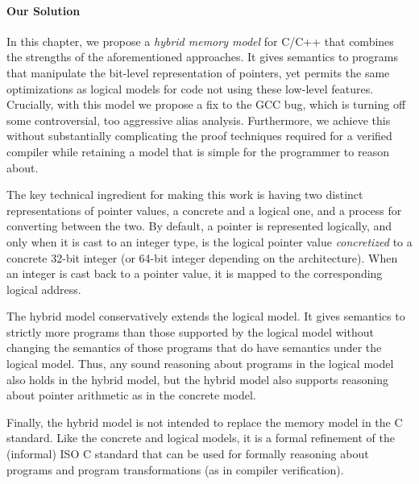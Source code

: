 
\paragraph{Our Solution}

In this chapter, we propose a \emph{hybrid memory model} for C/C++ that combines the strengths of
the aforementioned approaches.  It gives semantics to programs that manipulate the bit-level
representation of pointers, yet permits the same optimizations as logical models for code not using
these low-level features.  Crucially, with this model we propose a fix to the GCC bug, which is
turning off some controversial, too aggressive alias analysis.  Furthermore, we achieve this without
substantially complicating the proof techniques required for a verified compiler while retaining a
model that is simple for the programmer to reason about.

The key technical ingredient for making this work is having two
distinct representations of pointer values, a concrete and a logical one,
and a process for converting between the two.
By default, a pointer is represented logically, and only when it is
cast to an integer type, is the logical pointer value
\emph{concretized} to a concrete 32-bit integer (or 64-bit integer depending on the architecture).
When an integer is cast back to a pointer value, 
it is mapped to the corresponding logical address.

The hybrid model conservatively extends the logical model.  It
gives semantics to strictly more programs than those supported by the
logical model without changing the semantics of those programs that do
have semantics under the logical model. Thus, any sound reasoning
about programs in the logical model also holds in the hybrid
model, but the hybrid model also supports reasoning about
pointer arithmetic as in the concrete model.

Finally, the hybrid model is not intended to replace the
memory model in the C standard. Like the concrete and logical models,
it is a formal refinement of the (informal) ISO C standard that can be
used for formally reasoning about programs and program transformations
(as in compiler verification).

